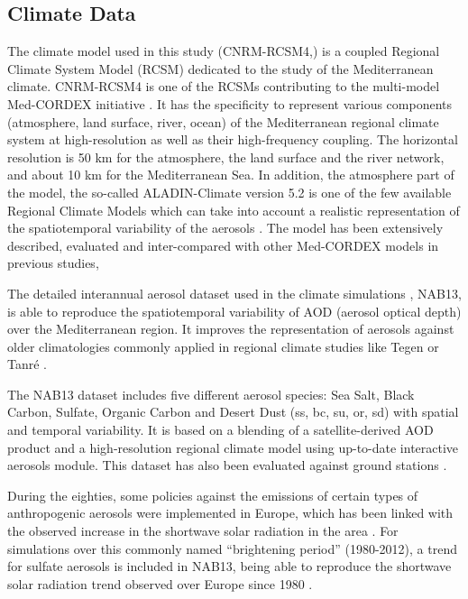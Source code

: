 \subsection{Climate Data}

The climate model used in this study (CNRM-RCSM4,\cite*{Sevault2014}) is a coupled Regional Climate System Model (RCSM) dedicated to the study of the Mediterranean climate. CNRM-RCSM4 is one of the RCSMs contributing to the multi-model Med-CORDEX initiative \cite*{Ruti2016}. It has the specificity to represent various components (atmosphere, land surface, river, ocean) of the Mediterranean regional climate system at high-resolution as well as their high-frequency coupling. The horizontal resolution is 50 km for the atmosphere, the land surface and the river network, and about 10 km for the Mediterranean Sea. In addition, the atmosphere part of the model, the so-called ALADIN-Climate version 5.2 \cite*{Colin2010} is one of the few available Regional Climate Models which can take into account a realistic representation of the spatiotemporal variability of the aerosols \cite*{Nabat2014}. The model has been extensively described, evaluated and inter-compared with other Med-CORDEX models in previous studies, \cite{Sevault2014, Nabat2013, Nabat2014,Flaounas2016, Gaertner2016, DellAquila2016, Harzallah2016, Cavicchia2016}

The detailed interannual aerosol dataset used in the climate simulations \cite*{Nabat2013}, NAB13, is able to reproduce the spatiotemporal variability of AOD (aerosol optical depth) over the Mediterranean region. It improves the representation of aerosols against older climatologies commonly applied in regional climate studies like Tegen \cite*{Tegen1997} or Tanré \cite*{Tanre1984}.

The NAB13 dataset includes five different aerosol species: Sea Salt, Black Carbon, Sulfate, Organic Carbon and Desert Dust (ss, bc, su, or, sd) with spatial and temporal variability. It is based on a blending of a satellite-derived AOD product and a high-resolution regional climate model using up-to-date interactive aerosols module. This dataset has also been evaluated against ground stations \cite*{Nabat2013}.

During the eighties, some policies against the emissions of certain types of anthropogenic aerosols were implemented in Europe, which has been linked with the observed increase in the shortwave solar radiation in the area \cite*{Wild2005}. For simulations over this commonly named ``brightening period'' (1980-2012), a trend for sulfate aerosols is included in NAB13, being able to reproduce the shortwave solar radiation trend observed over Europe since 1980 \cite*{Nabat2013}.


